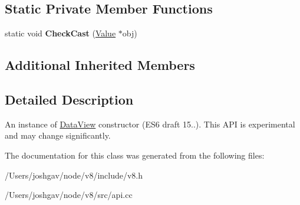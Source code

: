 \subsection*{Static Private Member Functions}
\begin{DoxyCompactItemize}
\item 
static void {\bfseries Check\+Cast} (\hyperlink{classv8_1_1_value}{Value} $\ast$obj)\hypertarget{classv8_1_1_data_view_a885ff37ba20928a02bad82e9765b62db}{}\label{classv8_1_1_data_view_a885ff37ba20928a02bad82e9765b62db}

\end{DoxyCompactItemize}
\subsection*{Additional Inherited Members}


\subsection{Detailed Description}
An instance of \hyperlink{classv8_1_1_data_view}{Data\+View} constructor (E\+S6 draft 15..). This A\+PI is experimental and may change significantly. 

The documentation for this class was generated from the following files\+:\begin{DoxyCompactItemize}
\item 
/\+Users/joshgav/node/v8/include/v8.\+h\item 
/\+Users/joshgav/node/v8/src/api.\+cc\end{DoxyCompactItemize}
